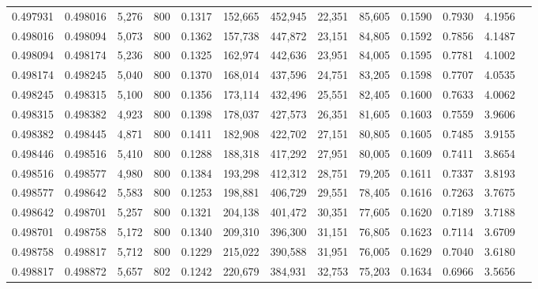 \begin{tabular}{rrrrrrrrrrrrr}
0.497931 & 0.498016 & 5,276 & 800 &                                     0.1317 & 152,665 & 452,945 &  22,351 &  85,605 & 0.1590 & 0.7930 & 4.1956 \\
0.498016 & 0.498094 & 5,073 & 800 &                                     0.1362 & 157,738 & 447,872 &  23,151 &  84,805 & 0.1592 & 0.7856 & 4.1487 \\
0.498094 & 0.498174 & 5,236 & 800 &                                     0.1325 & 162,974 & 442,636 &  23,951 &  84,005 & 0.1595 & 0.7781 & 4.1002 \\
0.498174 & 0.498245 & 5,040 & 800 &                                     0.1370 & 168,014 & 437,596 &  24,751 &  83,205 & 0.1598 & 0.7707 & 4.0535 \\
0.498245 & 0.498315 & 5,100 & 800 &                                     0.1356 & 173,114 & 432,496 &  25,551 &  82,405 & 0.1600 & 0.7633 & 4.0062 \\
0.498315 & 0.498382 & 4,923 & 800 &                                     0.1398 & 178,037 & 427,573 &  26,351 &  81,605 & 0.1603 & 0.7559 & 3.9606 \\
0.498382 & 0.498445 & 4,871 & 800 &                                     0.1411 & 182,908 & 422,702 &  27,151 &  80,805 & 0.1605 & 0.7485 & 3.9155 \\
0.498446 & 0.498516 & 5,410 & 800 &                                     0.1288 & 188,318 & 417,292 &  27,951 &  80,005 & 0.1609 & 0.7411 & 3.8654 \\
0.498516 & 0.498577 & 4,980 & 800 &                                     0.1384 & 193,298 & 412,312 &  28,751 &  79,205 & 0.1611 & 0.7337 & 3.8193 \\
0.498577 & 0.498642 & 5,583 & 800 &                                     0.1253 & 198,881 & 406,729 &  29,551 &  78,405 & 0.1616 & 0.7263 & 3.7675 \\
0.498642 & 0.498701 & 5,257 & 800 &                                     0.1321 & 204,138 & 401,472 &  30,351 &  77,605 & 0.1620 & 0.7189 & 3.7188 \\
0.498701 & 0.498758 & 5,172 & 800 &                                     0.1340 & 209,310 & 396,300 &  31,151 &  76,805 & 0.1623 & 0.7114 & 3.6709 \\
0.498758 & 0.498817 & 5,712 & 800 &                                     0.1229 & 215,022 & 390,588 &  31,951 &  76,005 & 0.1629 & 0.7040 & 3.6180 \\
0.498817 & 0.498872 & 5,657 & 802 &                                     0.1242 & 220,679 & 384,931 &  32,753 &  75,203 & 0.1634 & 0.6966 & 3.5656 \\

\end{tabular}
